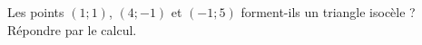 
\begin{exercice}\label{exosmath-0410}

    Les points \( (1;1)\), \( (4;-1)\) et \( (-1;5)\) forment-ils un triangle isocèle ? Répondre par le calcul.

\end{exercice}
